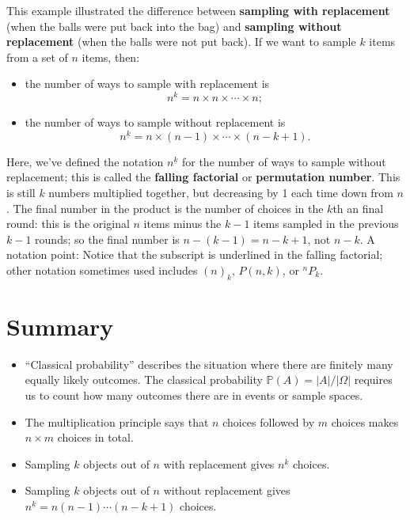 \documentclass[
  a4paper,
]{book}
\providecommand{\tightlist}{%
  \setlength{\itemsep}{0pt}\setlength{\parskip}{0pt}}
\theoremstyle{definition}
\theoremstyle{definition}
\theoremstyle{definition}
\theoremstyle{definition}
\theoremstyle{remark}
\begin{document}
This example illustrated the difference between \textbf{sampling with replacement} (when the balls were put back into the bag) and \textbf{sampling without replacement} (when the balls were not put back). If we want to sample \(k\) items from a set of \(n\) items, then:

\begin{itemize}
\tightlist
\item
  the number of ways to sample with replacement is
  \[ n^k = n\times n\times\cdots\times n;  \]
\item
  the number of ways to sample without replacement is
  \[ {n}^{\underline{k}} = n\times(n-1)\times \cdots\times (n-k+1) .\]
\end{itemize}

Here, we've defined the notation \({n}^{\underline{k}}\) for the number of ways to sample without replacement; this is called the \textbf{falling factorial} or \textbf{permutation number}. This is still \(k\) numbers multiplied together, but decreasing by 1 each time down from \(n\). The final number in the product is the number of choices in the \(k\)th an final round: this is the original \(n\) items minus the \(k-1\) items sampled in the previous \(k-1\) rounds; so the final number is \(n - (k-1) = n - k + 1\), not \(n - k\). A notation point: Notice that the subscript is underlined in the falling factorial; other notation sometimes used includes \((n)_k\), \(P(n,k)\), or \({}^nP_k\).

\hypertarget{summary-L05}{%
\section*{Summary}\label{summary-L05}}

\begin{itemize}
\tightlist
\item
  ``Classical probability'' describes the situation where there are finitely many equally likely outcomes. The classical probability \(\mathbb P(A) = |A|/|\Omega|\) requires us to count how many outcomes there are in events or sample spaces.
\item
  The multiplication principle says that \(n\) choices followed by \(m\) choices makes \(n \times m\) choices in total.
\item
  Sampling \(k\) objects out of \(n\) with replacement gives \(n^k\) choices.
\item
  Sampling \(k\) objects out of \(n\) without replacement gives \(n^{\underline{k}} = n(n-1)\cdots(n-k+1)\) choices.
\end{itemize}
\end{document}

